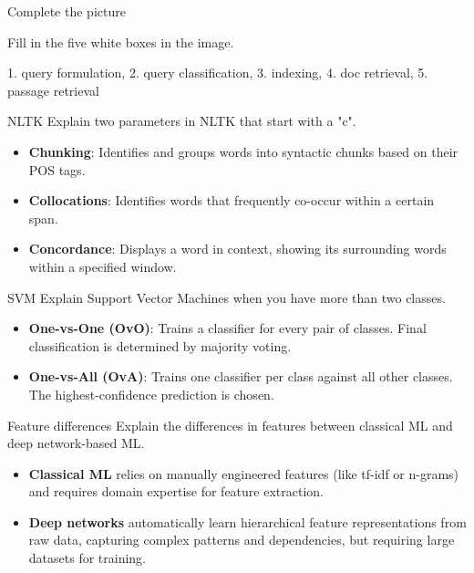 \documentclass{article}
\begin{document}
\begin{exercise}{Complete the picture}
  

  Fill in the five white boxes in the image.

  \begin{solution}
    1. query formulation, 2. query classification, 3. indexing, 4. doc retrieval, 5. passage retrieval
  \end{solution}
\end{exercise}

\begin{exercise}{NLTK}
  Explain two parameters in NLTK that start with a "c".

  \begin{solution}
    \begin{itemize}
      \item \textbf{Chunking}: Identifies and groups words into syntactic chunks based on their POS tags.
      \item \textbf{Collocations}: Identifies words that frequently co-occur within a certain span.
      \item \textbf{Concordance}: Displays a word in context, showing its surrounding words within a specified window.
    \end{itemize}
  \end{solution}
\end{exercise}

\begin{exercise}{SVM}
  Explain Support Vector Machines when you have more than two classes.

  \begin{solution}
    \begin{itemize}
        \item \textbf{One-vs-One (OvO)}: Trains a classifier for every pair of classes. Final classification is determined by majority voting.
        \item \textbf{One-vs-All (OvA)}: Trains one classifier per class against all other classes. The highest-confidence prediction is chosen.
    \end{itemize}
  \end{solution}
\end{exercise}

\begin{exercise}{Feature differences}
  Explain the differences in features between classical ML and deep network-based ML.

  \begin{solution}
    \begin{itemize}
        \item \textbf{Classical ML} relies on manually engineered features (like tf-idf or n-grams) and requires domain expertise for feature extraction.
        \item \textbf{Deep networks} automatically learn hierarchical feature representations from raw data, capturing complex patterns and dependencies, but requiring large datasets for training.
    \end{itemize}
  \end{solution}
\end{exercise}
\end{document}
